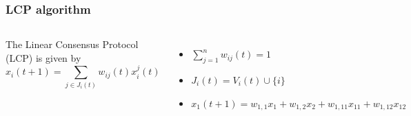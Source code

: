 \documentclass{beamer}
\begin{document}
\begin{frame}
\frametitle{LCP algorithm}
\begin{columns}[c] %

The Linear Consensus Protocol (LCP) is given by
\begin{equation*}
x_i(t+1)=\sum_{j\in J_i(t)}w_{ij}(t)x^{j}_{i}(t)
\end{equation*}
\begin{itemize}
\item $\sum_{j=1}^n w_{ij}(t)=1$
\item $J_i(t)=V_i(t)\cup \{i\}$
\item $x_1(t+1)= w_{1,1}x_1+w_{1,2}x_2+w_{1,11}x_{11}+w_{1,12}x_{12}$
\end{itemize}

    
    \includegraphics[scale=0.40]{figures/LCP.png}
	\centering
\end{columns}

\end{frame}

\end{document}
